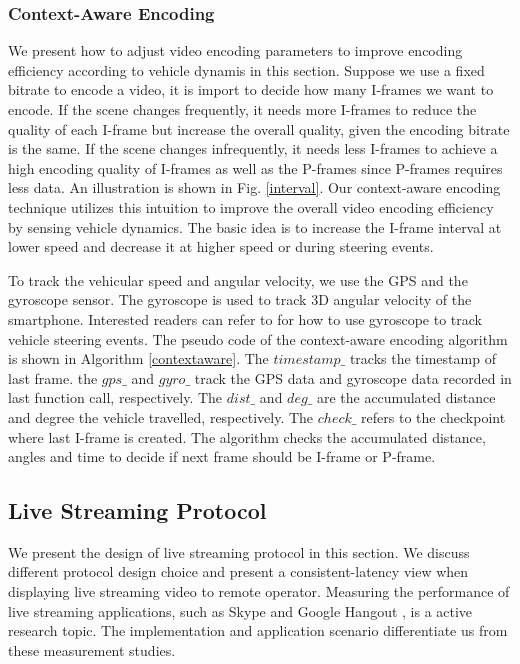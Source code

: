 \subsubsection{Context-Aware Encoding}


We present how to adjust video encoding parameters to improve
encoding efficiency according to vehicle dynamis in this section.
Suppose we use a fixed bitrate to encode a video, 
it is import to decide how many I-frames we want to encode. 
If the scene changes frequently, it needs more I-frames to reduce
the quality of each I-frame but increase the overall quality,
given the encoding bitrate is the same. 
If the scene changes infrequently, it needs less I-frames
to achieve a high encoding quality of I-frames 
as well as the P-frames since P-frames requires less data. 
An illustration is shown in Fig. \ref{interval}.
Our context-aware encoding technique utilizes this 
intuition to improve the overall video encoding efficiency
by sensing vehicle dynamics. 
The basic idea is to increase the I-frame interval at lower
speed and decrease it at higher speed or during steering events. 


To track the vehicular speed and angular velocity, we use
the GPS and the gyroscope sensor. 
The gyroscope is used to track 3D angular velocity of the 
smartphone. 
Interested readers can refer to \cite{wang2013sensing, chen2015invisible}
for how to use gyroscope to track vehicle steering events. 
The pseudo code of the context-aware encoding algorithm 
is shown in Algorithm \ref{contextaware}.
The $timestamp\_$ tracks the timestamp of last frame. 
the $gps\_$ and $gyro\_$ track the GPS data and gyroscope data 
recorded in last function call, respectively.
The $dist\_$ and $deg\_$ are the accumulated distance
and degree the vehicle travelled, respectively.
The $check\_$ refers to the checkpoint where last I-frame is created.
The algorithm checks the accumulated distance, angles and time
to decide if next frame should be I-frame or P-frame. 



\subsection{Live Streaming Protocol}
\label{streaming_protocol}


We present the design of live streaming protocol in this section. 
We discuss different protocol design choice and present a consistent-latency
view when displaying live streaming video to remote operator. 
Measuring the performance of live streaming applications, such as 
Skype \cite{zhang2012profiling} and Google Hangout \cite{yu2014can}, 
is a active research topic. 
The implementation and application scenario differentiate us from
these measurement studies. 



